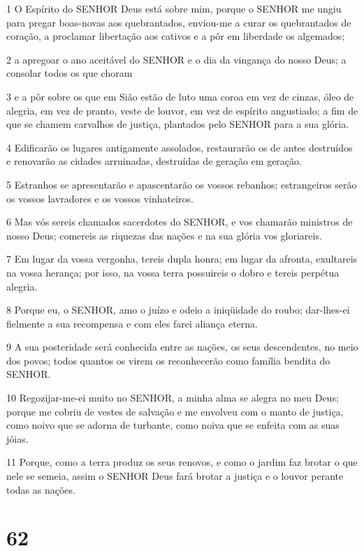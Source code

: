 \par 1 O Espírito do SENHOR Deus está sobre mim, porque o SENHOR me ungiu para pregar boas-novas aos quebrantados, enviou-me a curar os quebrantados de coração, a proclamar libertação aos cativos e a pôr em liberdade os algemados;
\par 2 a apregoar o ano aceitável do SENHOR e o dia da vingança do nosso Deus; a consolar todos os que choram
\par 3 e a pôr sobre os que em Sião estão de luto uma coroa em vez de cinzas, óleo de alegria, em vez de pranto, veste de louvor, em vez de espírito angustiado; a fim de que se chamem carvalhos de justiça, plantados pelo SENHOR para a sua glória.
\par 4 Edificarão os lugares antigamente assolados, restaurarão os de antes destruídos e renovarão as cidades arruinadas, destruídas de geração em geração.
\par 5 Estranhos se apresentarão e apascentarão os vossos rebanhos; estrangeiros serão os vossos lavradores e os vossos vinhateiros.
\par 6 Mas vós sereis chamados sacerdotes do SENHOR, e vos chamarão ministros de nosso Deus; comereis as riquezas das nações e na sua glória vos gloriareis.
\par 7 Em lugar da vossa vergonha, tereis dupla honra; em lugar da afronta, exultareis na vossa herança; por isso, na vossa terra possuireis o dobro e tereis perpétua alegria.
\par 8 Porque eu, o SENHOR, amo o juízo e odeio a iniqüidade do roubo; dar-lhes-ei fielmente a sua recompensa e com eles farei aliança eterna.
\par 9 A sua posteridade será conhecida entre as nações, os seus descendentes, no meio dos povos; todos quantos os virem os reconhecerão como família bendita do SENHOR.
\par 10 Regozijar-me-ei muito no SENHOR, a minha alma se alegra no meu Deus; porque me cobriu de vestes de salvação e me envolveu com o manto de justiça, como noivo que se adorna de turbante, como noiva que se enfeita com as suas jóias.
\par 11 Porque, como a terra produz os seus renovos, e como o jardim faz brotar o que nele se semeia, assim o SENHOR Deus fará brotar a justiça e o louvor perante todas as nações.

\chapter{62}

